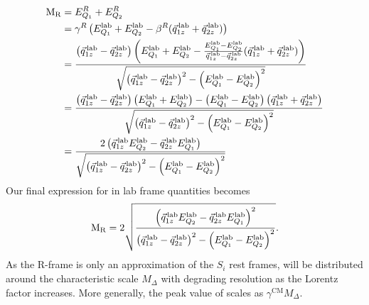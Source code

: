 \begin{align}
  \mathrm{M_R} &= E_{Q_1}^R + E_{Q_2}^R \\
      &= \gamma^R \left( E_{Q_1}^{\textrm{lab}} + E_{Q_2}^{\textrm{lab}} - \beta^R (
\vec{q}_{1z}^{\,\textrm{lab}} + \vec{q}_{2z}^{\,\textrm{lab}}) \right) \\
      &= \frac{\left( \vec{q}_{1z}^{\,\textrm{lab}} - \vec{q}_{2z}^{\,\textrm{lab}}\right) 
               \left( E_{Q_1}^{\textrm{lab}} + E_{Q_2}^{\textrm{lab}} - \frac{E_{Q_1}^{\textrm{lab}}
- E_{Q_2}^{\textrm{lab}}}{\vec{q}_{1z}^{\,\textrm{lab}} - \vec{q}_{2z}^{\,\textrm{lab}}}
(\vec{q}_{1z}^{\,\textrm{lab}} + \vec{q}_{2z}^{\,\textrm{lab}}) \right)}
              { \sqrt{ \left( \vec{q}_{1z}^{\,\textrm{lab}} - \vec{q}_{2z}^{\,\textrm{lab}}
\right)^2 
                      -\left( E_{Q_1}^{\textrm{lab}} - E_{Q_2}^{\textrm{lab}}\right)^2 }} \\
      &= \frac{\left( \vec{q}_{1z}^{\,\textrm{lab}} - \vec{q}_{2z}^{\,\textrm{lab}} \right) 
               \left( E_{Q_1}^{\textrm{lab}} + E_{Q_2}^{\textrm{lab}} \right) 
               - 
               \left( E_{Q_1}^{\textrm{lab}} - E_{Q_2}^{\textrm{lab}} \right)
               \left( \vec{q}_{1z}^{\,\textrm{lab}} + \vec{q}_{2z}^{\,\textrm{lab}} \right) }
              { \sqrt{ \left( \vec{q}_{1z}^{\,\textrm{lab}} - \vec{q}_{2z}^{\,\textrm{lab}}
\right)^2 
                      -\left( E_{Q_1}^{\textrm{lab}} - E_{Q_2}^{\textrm{lab}}\right)^2 }} \\
      &= \frac{2 \left( \vec{q}_{1z}^{\,\textrm{lab}} E_{Q_2}^{\textrm{lab}} 
                       - \vec{q}_{2z}^{\,\textrm{lab}} E_{Q_1}^{\textrm{lab}} \right)}
              { \sqrt{ \left( \vec{q}_{1z}^{\,\textrm{lab}} - \vec{q}_{2z}^{\,\textrm{lab}}
\right)^2 
                      -\left( E_{Q_1}^{\textrm{lab}} - E_{Q_2}^{\textrm{lab}}\right)^2 }}
\end{align}
Our final expression for \mr in lab frame quantities becomes
\begin{equation}
  \mathrm{M_R} = 2 \sqrt { \frac{ \left( \vec{q}_{1z}^{\,\textrm{lab}} E_{Q_2}^{\textrm{lab}} 
                       - \vec{q}_{2z}^{\,\textrm{lab}} E_{Q_1}^{\textrm{lab}} \right) ^2}
                       { \left( \vec{q}_{1z}^{\,\textrm{lab}} - \vec{q}_{2z}^{\,\textrm{lab}}
\right)^2 
                        -\left( E_{Q_1}^{\textrm{lab}} - E_{Q_2}^{\textrm{lab}}\right)^2 }} . 
\end{equation}
As the R-frame is only an approximation of the $S_i$ rest frames, \mr will be distributed around
the characteristic scale $M_\Delta$ with degrading resolution as the Lorentz factor increases. 
More generally, the peak value of \mr scales as $\gamma^{\textrm{CM}}M_\Delta$.

